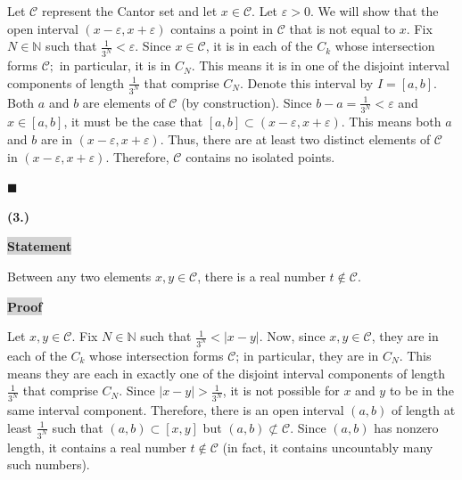 \documentclass[12pt]{article}
\newcommand{\mybox}{%
    \collectbox{%
        \setlength{\fboxsep}{2pt}%
        \fbox{\BOXCONTENT}%
    }%
}
\begin{document}
\noindent 

\vspace{3mm}

\noindent Let $\mathcal{C}$ represent the Cantor set and let $x\in\mathcal{C}$. Let $\varepsilon>0$. We will show that the open interval $(x-\varepsilon, x+\varepsilon)$ contains a point in $\mathcal{C}$ that is not equal to $x$. Fix $N\in\mathbb{N}$ such that $\frac{1}{3^N}<\varepsilon.$ Since $x\in\mathcal{C}$, it is in each of the $C_k$ whose intersection forms $\mathcal{C};$ in particular, it is in $C_N$. This means it is in one of the disjoint interval components of length $\frac{1}{3^N}$ that comprise $C_N$. Denote this interval by $I=[a,b]$. Both $a$ and $b$ are elements of $\mathcal{C}$ (by construction). Since $b-a = \frac{1}{3^N} < \varepsilon$ and $x\in[a,b]$, it must be the case that $[a,b]\subset (x - \varepsilon, x+\varepsilon)$. This means both $a$ and $b$ are in $(x-\varepsilon,x+\varepsilon)$. Thus, there are at least two distinct elements of $\mathcal{C}$ in $(x-\varepsilon, x+\varepsilon).$ Therefore, $\mathcal{C}$ contains no isolated points.

\hfill$\blacksquare$

\pagebreak

\noindent \textbf{(3.)}

\vspace{3mm}

\noindent\mybox{\colorbox{lightgray}{\textbf{Statement}}}\hspace{3mm}\hrulefill

\noindent Between any two elements $x,y\in\mathcal{C}$, there is a real number $t\not\in\mathcal{C}.$

\vspace{5mm}

\noindent\mybox{\colorbox{lightgray}{\textbf{Proof}}}\hspace{3mm}\hrulefill

\noindent Let $x,y\in\mathcal{C}$. Fix $N\in\mathbb{N}$ such that $\frac{1}{3^N} < |x-y|.$ Now, since $x,y\in\mathcal{C}$, they are in each of the $C_k$ whose intersection forms $\mathcal{C}$; in particular, they are in $C_N$. This means they are each in exactly one of the disjoint interval components of length $\frac{1}{3^N}$ that comprise $C_N$. Since $|x-y|>\frac{1}{3^N}$, it is not possible for $x$ and $y$ to be in the same interval component. Therefore, there is an open interval $(a,b)$ of length at least $\frac{1}{3^N}$ such that $(a,b)\subset[x,y]$ but $(a,b)\not\subset\mathcal{C}$. Since $(a,b)$ has nonzero length, it contains a real number $t\not\in\mathcal{C}$ (in fact, it contains uncountably many such numbers). 
\end{document}
